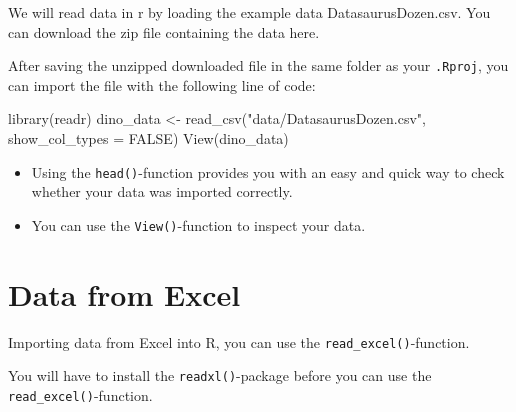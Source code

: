 \documentclass[
  letterpaper,
  DIV=11,
  numbers=noendperiod]{scrreprt}
\newenvironment{Shaded}{\begin{snugshade}}{\end{snugshade}}
\newcommand{\AttributeTok}[1]{\textcolor[rgb]{0.40,0.45,0.13}{#1}}
\newcommand{\ConstantTok}[1]{\textcolor[rgb]{0.56,0.35,0.01}{#1}}
\newcommand{\FunctionTok}[1]{\textcolor[rgb]{0.28,0.35,0.67}{#1}}
\newcommand{\NormalTok}[1]{\textcolor[rgb]{0.00,0.23,0.31}{#1}}
\newcommand{\OtherTok}[1]{\textcolor[rgb]{0.00,0.23,0.31}{#1}}
\newcommand{\StringTok}[1]{\textcolor[rgb]{0.13,0.47,0.30}{#1}}
\providecommand{\tightlist}{%
  \setlength{\itemsep}{0pt}\setlength{\parskip}{0pt}}\usepackage{longtable,booktabs,array}
\begin{document}
We will read data in r by loading the example data DatasaurusDozen.csv.
You can download the zip file containing the data here.

After saving the unzipped downloaded file in the same folder as your
\texttt{.Rproj}, you can import the file with the following line of
code:

\begin{Shaded}
\begin{Highlighting}[]
\FunctionTok{library}\NormalTok{(readr)}
\NormalTok{dino\_data }\OtherTok{\textless{}{-}} \FunctionTok{read\_csv}\NormalTok{(}\StringTok{"data/DatasaurusDozen.csv"}\NormalTok{, }\AttributeTok{show\_col\_types =} \ConstantTok{FALSE}\NormalTok{)}
\FunctionTok{View}\NormalTok{(dino\_data)}
\end{Highlighting}
\end{Shaded}

\begin{tcolorbox}[enhanced jigsaw, rightrule=.15mm, colframe=quarto-callout-tip-color-frame, breakable, opacityback=0, bottomrule=.15mm, arc=.35mm, left=2mm, leftrule=.75mm, toprule=.15mm, colback=white]
\begin{minipage}[t]{5.5mm}
\textcolor{quarto-callout-tip-color}{\faLightbulb}
\end{minipage}%
\begin{minipage}[t]{\textwidth - 5.5mm}

\begin{itemize}
\tightlist
\item
  Using the \texttt{head()}-function provides you with an easy and quick
  way to check whether your data was imported correctly.
\item
  You can use the \texttt{View()}-function to inspect your data.
\end{itemize}

\end{minipage}%
\end{tcolorbox}

\hypertarget{data-from-excel}{%
\section{Data from Excel}\label{data-from-excel}}

Importing data from Excel into R, you can use the
\texttt{read\_excel()}-function.

\begin{tcolorbox}[enhanced jigsaw, rightrule=.15mm, colframe=quarto-callout-important-color-frame, breakable, opacityback=0, bottomrule=.15mm, arc=.35mm, left=2mm, leftrule=.75mm, toprule=.15mm, colback=white]
\begin{minipage}[t]{5.5mm}
\textcolor{quarto-callout-important-color}{\faExclamation}
\end{minipage}%
\begin{minipage}[t]{\textwidth - 5.5mm}

You will have to install the \texttt{readxl()}-package before you can
use the \texttt{read\_excel()}-function.

\end{minipage}%
\end{tcolorbox}
\end{document}
